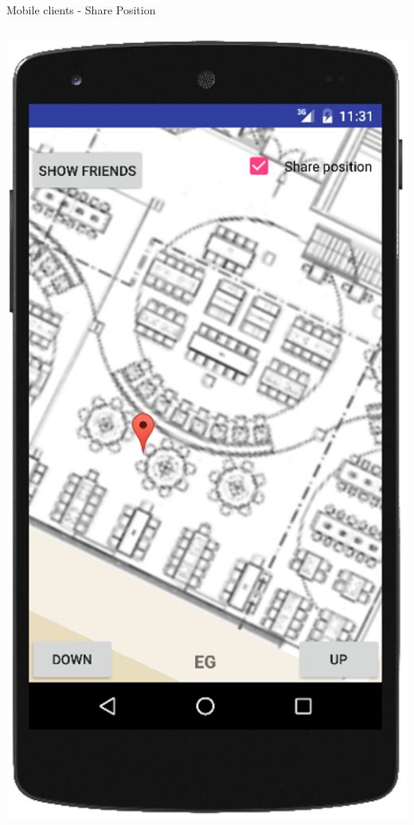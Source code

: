 \documentclass[11pt]{beamer}
\begin{document}
\begin{frame}{Mobile clients - Share Position}
\begin{columns}[T]
	\begin{column}{.4\textwidth}
	\includegraphics[scale=0.27]{android_pinpoint}
	\end{column}
\end{columns}

\end{frame}
\end{document}
